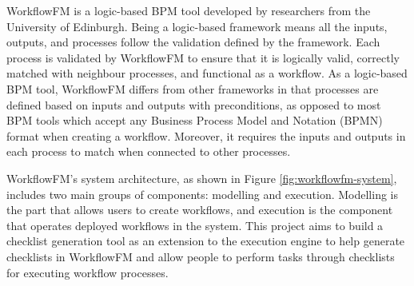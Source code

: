 WorkflowFM \cite{papapanagiotou2017workflowfm} is a logic-based BPM tool developed by researchers from the University of Edinburgh. Being a logic-based framework means all the inputs, outputs, and processes follow the validation defined by the framework.
Each process is validated by WorkflowFM to ensure that it is logically valid, correctly matched with neighbour processes, and functional as a workflow.
As a logic-based BPM tool, WorkflowFM differs from other frameworks in that processes are defined based on inputs and outputs with preconditions, as opposed to most BPM tools which accept any Business Process Model and Notation (BPMN) \cite{bpmn} format when creating a workflow. Moreover, it requires the inputs and outputs in each process to match when connected to other processes.



WorkflowFM's system architecture, as shown in Figure \ref{fig:workflowfm-system}, includes two main groups of components: modelling and execution. Modelling is the part that allows users to create workflows, and execution is the component that operates deployed workflows in the system. This project aims to build a checklist generation tool as an extension to the execution engine to help generate checklists in WorkflowFM and allow people to perform tasks through checklists for executing workflow processes.



